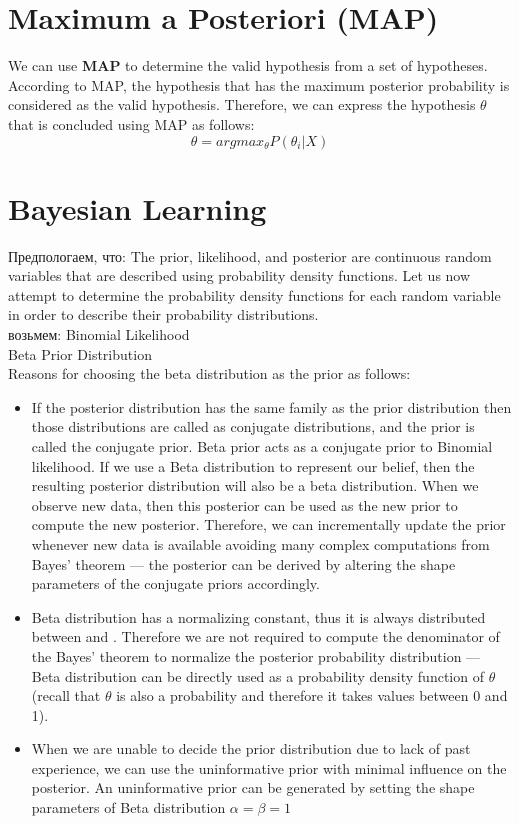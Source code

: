 \documentclass{book}
\begin{document}
\section{Maximum a Posteriori (MAP)}
We can use \textbf{MAP} to determine the valid hypothesis from a set of
hypotheses. According to MAP, the hypothesis that has the maximum
posterior probability is considered as the valid hypothesis. Therefore,
we can express the hypothesis $\theta$ that is concluded using MAP as
follows:$$\theta = argmax_{\theta}P(\theta_i|X)$$
\section{Bayesian Learning}
Предпологаем, что: The prior, likelihood, and posterior are continuous random variables that are described using probability density functions. 
Let us now attempt to determine the probability density functions for
each random variable in order to describe their probability
distributions.\\
возьмем: Binomial Likelihood\\
Beta Prior Distribution\\
Reasons for choosing the beta distribution as the prior as follows:\begin{itemize}
\item If the posterior distribution has the same family as the prior
distribution then those distributions are called as conjugate
distributions, and the prior is called the conjugate prior. Beta prior acts as a conjugate prior to Binomial likelihood. If we use a Beta
distribution to represent our belief, then the resulting posterior
distribution will also be a beta distribution. When we observe new
data, then this posterior can be used as the new prior to compute
the new posterior. Therefore, we can incrementally update the
prior whenever new data is available avoiding many complex
computations from Bayes’ theorem — the posterior can be derived
by altering the shape parameters of the conjugate priors
accordingly.
\item Beta distribution has a normalizing constant, thus it is always
distributed between and . Therefore we are not required to
compute the denominator of the Bayes’ theorem to normalize the
posterior probability distribution — Beta distribution can be
directly used as a probability density function of $\theta$(recall that $\theta$ is also a probability and therefore it takes values between 0 and 1).
\item When we are unable to decide the prior distribution due
to lack of past experience, we can use the uninformative prior with
minimal influence on the posterior. An uninformative prior can be
generated by setting the shape parameters of Beta distribution $\alpha = \beta=1$
\end{itemize}
\end{document}
